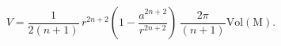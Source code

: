 \begin{equation}
V=\frac{1}{2(n+1)}\,
r^{2n+2}\left(1-\frac{a^{2n+2}}{r^{2n+2}}\right)\,\frac{2\pi}{(n+1)}
{\mathrm{Vol{(M)}}}.
\end{equation}

